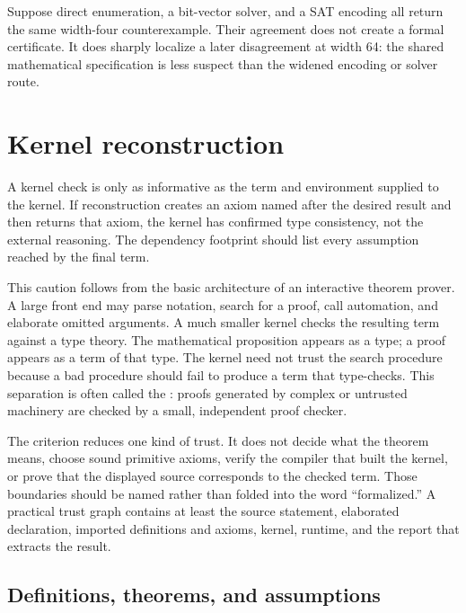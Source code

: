 \begin{example}[title={Agreement can still be diagnostically valuable}]
Suppose direct enumeration, a bit-vector solver, and a SAT encoding all return
the same width-four counterexample. Their agreement does not create a formal
certificate. It does sharply localize a later disagreement at width 64: the
shared mathematical specification is less suspect than the widened encoding
or solver route.
\end{example}

\section{Kernel reconstruction}

A kernel check is only as informative as the term and environment supplied to
the kernel. If reconstruction creates an axiom named after the desired result
and then returns that axiom, the kernel has confirmed type consistency, not
the external reasoning. The dependency footprint should list every assumption
reached by the final term.

This caution follows from the basic architecture of an interactive theorem
prover. A large front end may parse notation, search for a proof, call
automation, and elaborate omitted arguments. A much smaller kernel checks the
resulting term against a type theory. The mathematical proposition appears as
a type; a proof appears as a term of that type. The kernel need not trust the
search procedure because a bad procedure should fail to produce a term that
type-checks. This separation is often called the :
proofs generated by complex or untrusted machinery are checked by a small,
independent proof checker.

The criterion reduces one kind of trust. It does not decide what the theorem
means, choose sound primitive axioms, verify the compiler that built the
kernel, or prove that the displayed source corresponds to the checked term.
Those boundaries should be named rather than folded into the word
``formalized.'' A practical trust graph contains at least the source
statement, elaborated declaration, imported definitions and axioms, kernel,
runtime, and the report that extracts the result.

\subsection{Definitions, theorems, and assumptions}

